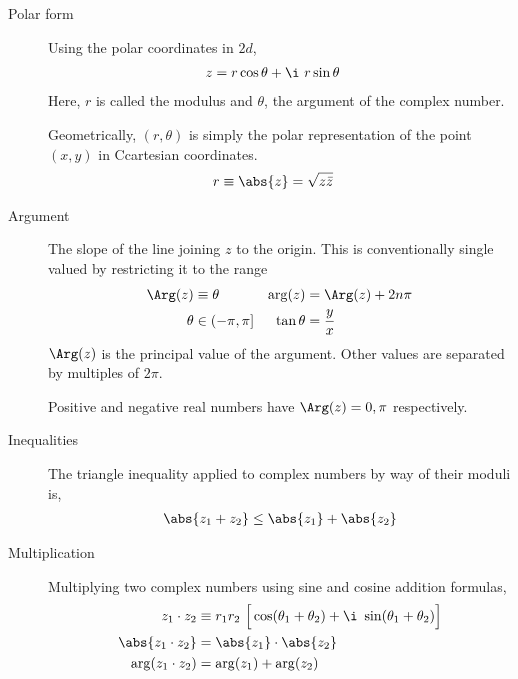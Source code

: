 \begin{description}
    \item[Polar form]  Using the polar coordinates in $ 2d $,
        \begin{align}
            z & = r \cos\theta + \i\ r \sin\theta
        \end{align}
        Here, $ r $ is called the modulus and $ \theta $, the argument of the complex
        number. \par
        Geometrically, $ (r, \theta) $ is simply the polar representation of the point
        $ (x, y) $ in Ccartesian coordinates.
        \begin{align}
            r & \equiv \abs{z} = \sqrt{z\bar{z}}
        \end{align}

    \item[Argument] The slope of the line joining $ z $ to the origin. This is
        conventionally single valued by restricting it to the range
        \begin{align}
            \Arg(z) & \equiv \theta   & \arg(z)     & = \Arg(z) + 2n\pi \\
            \theta  & \in (-\pi, \pi] & \tan \theta & = \frac{y}{x}
        \end{align}
        $ \Arg(z) $ is the principal value of the argument. Other values are separated by
        multiples of $ 2\pi $. \par
        Positive and negative real numbers have $ \Arg(z) = 0, \pi $ respectively.

    \item[Inequalities] The triangle inequality applied to complex numbers by way of
        their moduli is,
        \begin{align}
            \abs{z_1 + z_2} \leq \abs{z_1} + \abs{z_2}
        \end{align}

    \item[Multiplication] Multiplying two complex numbers using sine and cosine addition
        formulas,
        \begin{align}
            z_1 \cdot z_2       & \equiv r_1r_2\ \Big[\cos(\theta_1 + \theta_2)
            + \i\ \sin(\theta_1 + \theta_2) \Big]                               \\
            \abs{z_1 \cdot z_2} & = \abs{z_1} \cdot \abs{z_2}                   \\
            \arg(z_1 \cdot z_2) & = \arg(z_1) + \arg(z_2)
        \end{align}


\end{description}
